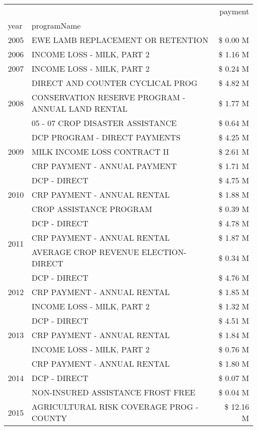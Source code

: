 \begin{tabular}{llr}
\toprule
 &  & payment \\
year & programName &  \\
\midrule
2005 & EWE LAMB REPLACEMENT OR RETENTION & \$ 0.00 M \\
\cline{1-3}
2006 & INCOME LOSS - MILK, PART 2 & \$ 1.16 M \\
\cline{1-3}
2007 & INCOME LOSS - MILK, PART 2 & \$ 0.24 M \\
\cline{1-3}
\multirow[t]{3}{*}{2008} & DIRECT AND COUNTER CYCLICAL PROG & \$ 4.82 M \\
 & CONSERVATION RESERVE PROGRAM - ANNUAL LAND RENTAL & \$ 1.77 M \\
 & 05 - 07 CROP DISASTER ASSISTANCE & \$ 0.64 M \\
\cline{1-3}
\multirow[t]{3}{*}{2009} & DCP PROGRAM - DIRECT PAYMENTS & \$ 4.25 M \\
 & MILK INCOME LOSS CONTRACT II & \$ 2.61 M \\
 & CRP PAYMENT - ANNUAL PAYMENT & \$ 1.71 M \\
\cline{1-3}
\multirow[t]{3}{*}{2010} & DCP - DIRECT & \$ 4.75 M \\
 & CRP PAYMENT - ANNUAL RENTAL & \$ 1.88 M \\
 & CROP ASSISTANCE PROGRAM & \$ 0.39 M \\
\cline{1-3}
\multirow[t]{3}{*}{2011} & DCP - DIRECT & \$ 4.78 M \\
 & CRP PAYMENT - ANNUAL RENTAL & \$ 1.87 M \\
 & AVERAGE CROP REVENUE ELECTION-DIRECT & \$ 0.34 M \\
\cline{1-3}
\multirow[t]{3}{*}{2012} & DCP - DIRECT & \$ 4.76 M \\
 & CRP PAYMENT - ANNUAL RENTAL & \$ 1.85 M \\
 & INCOME LOSS - MILK, PART 2 & \$ 1.32 M \\
\cline{1-3}
\multirow[t]{3}{*}{2013} & DCP - DIRECT & \$ 4.51 M \\
 & CRP PAYMENT - ANNUAL RENTAL & \$ 1.84 M \\
 & INCOME LOSS - MILK, PART 2 & \$ 0.76 M \\
\cline{1-3}
\multirow[t]{3}{*}{2014} & CRP PAYMENT - ANNUAL RENTAL & \$ 1.80 M \\
 & DCP - DIRECT & \$ 0.07 M \\
 & NON-INSURED ASSISTANCE FROST FREE & \$ 0.04 M \\
\cline{1-3}
\multirow[t]{3}{*}{2015} & AGRICULTURAL RISK COVERAGE PROG - COUNTY & \$ 12.16 M \\

\end{tabular}
